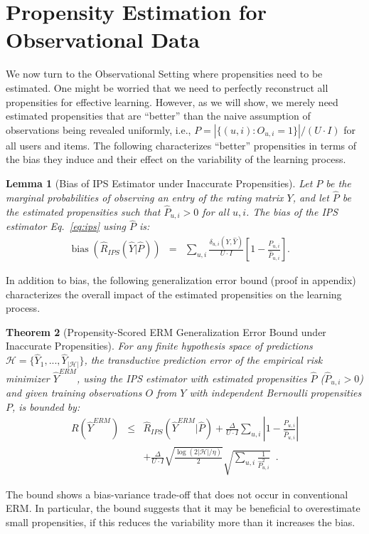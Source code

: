\documentclass{article}
\newtheorem{theorem}{Theorem}[section]
\newtheorem{lemma}[theorem]{Lemma}
\DeclareMathOperator{\bias}{bias}
\newcommand{\user}{u}                       %
\newcommand{\users}{U}                      %
\newcommand{\movie}{i}                      %
\newcommand{\movies}{I}                     %
\newcommand{\ytrue}{Y}                      %
\newcommand{\ypred}{\hat{Y}}                %
\newcommand{\loss}[3]{\delta_{#1}(#2,#3)}   %
\newcommand{\lossum}{\loss{\user,\movie}{\ytrue}{\ypred}}
\newcommand{\obs}{O}                        %
\newcommand{\obselem}[1]{\obs_{#1}}
\newcommand{\obsum}{\obselem{\user,\movie}}
\newcommand{\probobs}{P}                    %
\newcommand{\probobselem}[1]{\probobs_{#1}}
\newcommand{\probobsum}{\probobselem{\user,\movie}}
\newcommand{\estprobobs}{\hat{P}}           %
\newcommand{\estprobobselem}[1]{\estprobobs_{#1}}
\newcommand{\estprobobsum}{\estprobobselem{\user,\movie}}
\newcommand{\hypspace}{\mathcal{H}}         %
\newcommand{\risk}[1]{R(#1)}                %
\newcommand{\ipsest}[2]{\hat{R}_{IPS}(#1|#2)}      %
\newcommand{\ipsestyhat}{\ipsest{\ypred}{\estprobobs}}
\begin{document}
\section{Propensity Estimation for Observational Data} \label{sec:propest}
We now turn to the Observational Setting where propensities need to be estimated. %
One might be worried that we need to perfectly reconstruct all propensities for effective learning. However, as we will show, we merely need estimated propensities that are ``better'' than the naive assumption of observations being revealed uniformly, i.e., $\probobs = |\{(\user,\movie):\obsum=1\}|/\left(U\cdot I\right)$ for all users and items. The following characterizes ``better'' propensities in terms of the bias they induce and their effect on the variability of the learning process.
\begin{lemma}[Bias of IPS Estimator under Inaccurate Propensities]
\label{lemma:bias}
Let $\probobs$ be the marginal probabilities of observing an entry of the rating matrix $\ytrue$, and let $\estprobobs$ be the estimated propensities such that $\estprobobsum > 0$ for all $\user, \movie$. The bias of the IPS estimator Eq.~\eqref{eq:ips} using $\hat{P}$ is:
\begin{eqnarray}
\bias\left(\ipsestyhat\right) & \!\!\!=\!\!\! & \sum_{\user,\movie} \frac{\lossum}{\users \cdot \movies} \!\left[ 1 - \frac{\probobsum}{\estprobobsum} \right]. \label{eq:ips_bias} \:\:\:\:\:
\end{eqnarray}
\end{lemma}
In addition to bias, the following generalization error bound (proof in appendix) characterizes the overall impact of the estimated propensities on the learning process. 
\begin{theorem}[Propensity-Scored ERM Generalization Error Bound under Inaccurate Propensities]
\label{thm:prop_erm_bias}
For any finite hypothesis space of predictions $\hypspace=\{\ypred_1, ..., \ypred_{|\hypspace|}\}$, the transductive prediction error of the empirical risk minimizer $\ypred^{ERM}$, using the IPS estimator with estimated propensities $\hat{P}$ ($\estprobobsum > 0$) and given training observations $\obs$ from $\ytrue$ with independent Bernoulli propensities $\probobs$, is bounded by:
\vspace{-3mm}
\begin{eqnarray}
\risk{\ypred^{ERM}} &\!\!\!\le\!\!\!&  \ipsest{\ypred^{ERM}}{\estprobobs} + \frac{\Delta}{\users\!\cdot\!\movies}\sum_{\user,\movie} \left| 1 - \frac{\probobsum}{\estprobobsum} \right|  \nonumber\\
&& +\frac{\Delta}{\users\!\cdot\!\movies} \sqrt{\frac{\log\left(2 |\hypspace|/\eta\right)}{2}} \sqrt{\sum_{\user,\movie} \frac{1}{\estprobobsum^2}} \enspace .
\end{eqnarray}
\vspace{-3mm}
\end{theorem}
\vspace{-1mm}
The bound shows a bias-variance trade-off that does not occur in conventional ERM. In particular,
the bound suggests that it may be beneficial to overestimate small propensities, if this reduces the variability more than it increases the bias.
\end{document}
